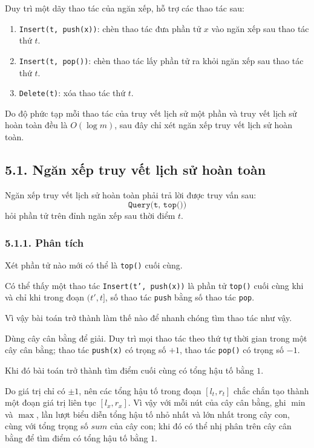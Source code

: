 \documentclass[11pt]{article}
\begin{document}
Duy trì một dãy thao tác của ngăn xếp, hỗ trợ các thao tác sau:

\begin{enumerate}
  \item \texttt{Insert(t, push(x))}: chèn thao tác đưa phần tử \(x\) vào ngăn
        xếp sau thao tác thứ \(t\).
  \item \texttt{Insert(t, pop())}: chèn thao tác lấy phần tử ra khỏi ngăn xếp
        sau thao tác thứ \(t\).
  \item \texttt{Delete(t)}: xóa thao tác thứ \(t\).
\end{enumerate}

Do độ phức tạp mỗi thao tác của truy vết lịch sử một phần và truy vết lịch sử
hoàn toàn đều là \(O(\log m)\), sau đây chỉ xét ngăn xếp truy vết lịch sử
hoàn toàn.

\subsection*{5.1. Ngăn xếp truy vết lịch sử hoàn toàn}

Ngăn xếp truy vết lịch sử hoàn toàn phải trả lời được truy vấn sau:
\[
\texttt{Query(t, top())}
\]
hỏi phần tử trên đỉnh ngăn xếp sau thời điểm \(t\).

\subsubsection*{5.1.1. Phân tích}

Xét phần tử nào mới có thể là \texttt{top()} cuối cùng.

Có thể thấy một thao tác \texttt{Insert(t', push(x))} là phần tử
\texttt{top()} cuối cùng khi và chỉ khi trong đoạn \((t',t]\), số thao tác
\texttt{push} bằng số thao tác \texttt{pop}.

Vì vậy bài toán trở thành làm thế nào để nhanh chóng tìm thao tác như vậy.

Dùng cây cân bằng để giải. Duy trì mọi thao tác theo thứ tự thời gian trong
một cây cân bằng; thao tác \texttt{push(x)} có trọng số \(+1\), thao tác
\texttt{pop()} có trọng số \(-1\).

Khi đó bài toán trở thành tìm điểm cuối cùng có tổng hậu tố bằng \(1\).

Do giá trị chỉ có \(\pm 1\), nên các tổng hậu tố trong đoạn \([l_t,r_t]\)
chắc chắn tạo thành một đoạn giá trị liên tục \([l_x,r_x]\). Vì vậy với mỗi
nút của cây cân bằng, ghi \(\min\) và \(\max\), lần lượt biểu diễn tổng hậu tố
nhỏ nhất và lớn nhất trong cây con, cùng với tổng trọng số \(\mathit{sum}\)
của cây con; khi đó có thể nhị phân trên cây cân bằng để tìm điểm có tổng hậu
tố bằng \(1\).
\end{document}
